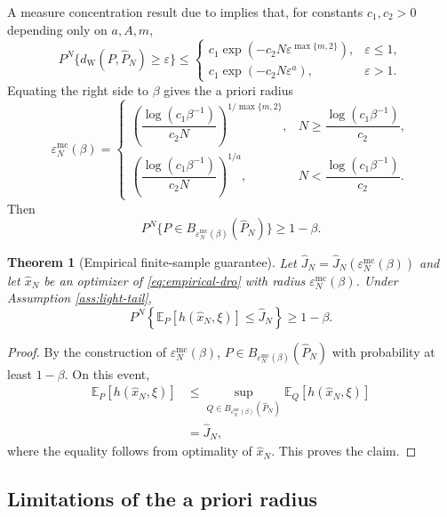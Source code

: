 \documentclass[11pt]{article}
\newtheorem{theorem}{Theorem}[section]
\newcommand{\E}{\mathbb{E}}
\newcommand{\1}{\mathbf{1}}
\newcommand{\dW}{d_{\mathrm W}}
\newcommand{\Phat}{\widehat P_N}
\newcommand{\epsmc}{\varepsilon_N^{\mathrm{mc}}}
\begin{document}
A measure concentration result due to \citet{fournier2015rate} implies that, for constants $c_1,c_2>0$ depending only on $a,A,m$,
\begin{equation}\label{eq:mc-ineq}
P^N\{\dW(P,\Phat)\ge\varepsilon\}\le
\begin{cases}
    c_1\exp(-c_2N\varepsilon^{\max\{m,2\}}), & \varepsilon\le1,\\
    c_1\exp(-c_2N\varepsilon^a), & \varepsilon>1.
\end{cases}
\end{equation}
Equating the right side to $\beta$ gives the a priori radius
\begin{equation}\label{eq:eps-mc}
\epsmc(\beta)=
\begin{cases}
\left(\dfrac{\log(c_1\beta^{-1})}{c_2N}\right)^{1/\max\{m,2\}}, & N\ge \dfrac{\log(c_1\beta^{-1})}{c_2},\\[1.3em]
\left(\dfrac{\log(c_1\beta^{-1})}{c_2N}\right)^{1/a}, & N< \dfrac{\log(c_1\beta^{-1})}{c_2}.
\end{cases}
\end{equation}
Then
\begin{equation}
    P^N\{P\in B_{\epsmc(\beta)}(\Phat)\}\ge1-\beta.
\end{equation}

\begin{theorem}[Empirical finite-sample guarantee]\label{thm:emp-guarantee}
Let $\widehat J_N=\widehat J_N(\epsmc(\beta))$ and let $\widehat x_N$ be an optimizer of \eqref{eq:empirical-dro} with radius $\epsmc(\beta)$. Under Assumption \ref{ass:light-tail},
\begin{equation}
    P^N\left\{\E_P[h(\widehat x_N,\xi)]\le \widehat J_N\right\}\ge1-\beta.
\end{equation}
\end{theorem}

\begin{proof}
By the construction of $\epsmc(\beta)$, $P\in B_{\epsmc(\beta)}(\Phat)$ with probability at least $1-\beta$. On this event,
\begin{align*}
    \E_P[h(\widehat x_N,\xi)]
    &\le \sup_{Q\in B_{\epsmc(\beta)}(\Phat)}\E_Q[h(\widehat x_N,\xi)]\\
    &= \widehat J_N,
\end{align*}
where the equality follows from optimality of $\widehat x_N$. This proves the claim.
\end{proof}

\subsection{Limitations of the a priori radius}
\end{document}
